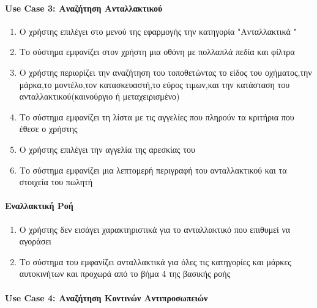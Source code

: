 \documentclass{../ol-softwaremanual}
\begin{document}
	
    \paragraph{\en Use Case 3: \gr Αναζήτηση Ανταλλακτικού}	
    
    \begin{enumerate}
    	\item Ο χρήστης επιλέγει στο μενού της εφαρμογής την κατηγορία  \en"\gr Ανταλλακτικά \en"\gr
    	\item Το σύστημα εμφανίζει στον χρήστη μια οθόνη με πολλαπλά πεδία και φίλτρα
    	\item Ο χρήστης περιορίζει την αναζήτηση του τοποθετώντας το είδος του οχήματος,την μάρκα,το μοντέλο,τον κατασκευαστή,το εύρος τιμων,και την κατάσταση του ανταλλακτικού(καινούργιο ή μεταχειρισμένο)
    	\item Το σύστημα εμφανίζει τη λίστα με τις αγγελίες που πληρούν τα κριτήρια που έθεσε ο χρήστης
    	\item Ο χρήστης επιλέγει την αγγελία της αρεσκίας του
    	\item Το σύστημα εμφανίζει μια λεπτομερή περιγραφή του ανταλλακτικού και τα στοιχεία του πωλητή
    			
    \end{enumerate}

    \paragraph{Εναλλακτική Ροή}
	
	\begin{enumerate}
		\item Ο χρήστης δεν εισάγει χαρακτηριστικά για το ανταλλακτικό που επιθυμεί να αγοράσει
		\item Το σύστημα του εμφανίζει ανταλλακτικά για όλες τις κατηγορίες και μάρκες αυτοκινήτων και προχωρά από το βήμα 4 της βασικής ροής
	\end{enumerate}

     \paragraph{\en Use Case 4: \gr Αναζήτηση Κοντινών Αντιπροσωπειών}	
    
\end{document}
